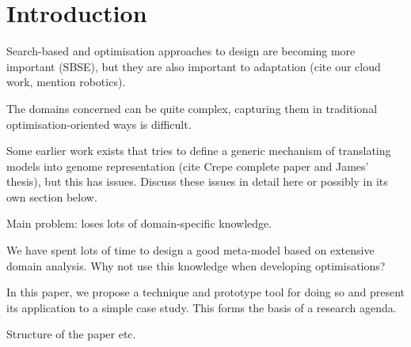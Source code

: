 \section{Introduction}
\label{section:introduction}

	\begin{draftlist}
		\item Search-based and optimisation approaches to design are becoming more important (SBSE), but they are also important to adaptation (cite our cloud work,
					mention robotics). 
		\item The domains concerned can be quite complex, capturing them in traditional optimisation-oriented ways is difficult.
		\item Some earlier work exists that tries to define a generic mechanism of translating models into genome representation (cite Crepe complete paper and
					James' thesis), but this has issues. Discuss these issues in detail here or possibly in its own section below.
		\item Main problem: loses lots of domain-specific knowledge.
		\item We have spent lots of time to design a good meta-model based on extensive domain analysis. Why not use this knowledge when developing optimisations?
		\item In this paper, we propose a technique and prototype tool for doing so and present its application to a simple case study. This forms the basis of a 
					research agenda.
		\item Structure of the paper etc.
	\end{draftlist}
